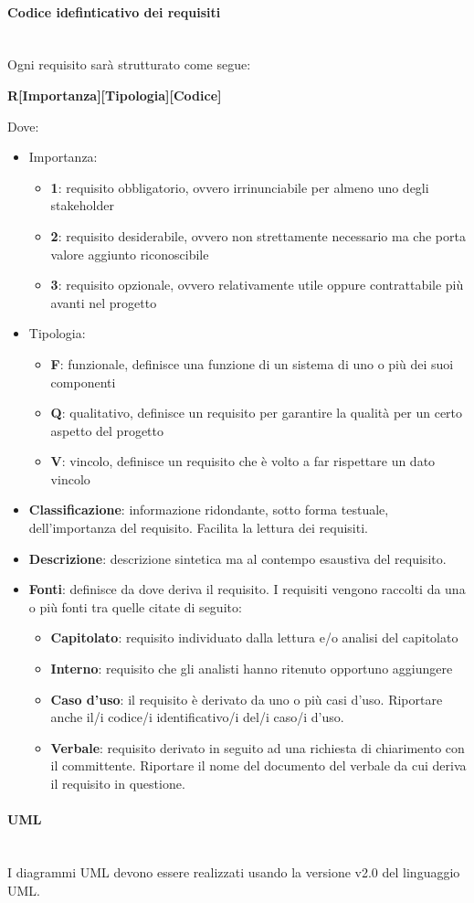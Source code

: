 \paragraph{Codice idefinticativo dei requisiti}\mbox{}\\
Ogni requisito sarà strutturato come segue:
\begin{center}
	\textbf{R[Importanza][Tipologia][Codice]}
\end{center}
Dove:
\begin{itemize}
		\item Importanza:
		\begin{itemize}
			\item \textbf{1}: requisito obbligatorio, ovvero irrinunciabile per almeno uno degli stakeholder
			\item \textbf{2}: requisito desiderabile, ovvero non strettamente necessario ma che porta valore aggiunto riconoscibile
			\item \textbf{3}: requisito opzionale, ovvero relativamente utile oppure contrattabile più avanti nel progetto
		\end{itemize}
		\item Tipologia:
		\begin{itemize}
			\item \textbf{F}: funzionale, definisce una funzione di un sistema di uno o più dei suoi componenti
			\item \textbf{Q}: qualitativo, definisce un requisito per garantire la qualità per un certo aspetto del progetto
			\item \textbf{V}: vincolo, definisce un requisito che è volto a far rispettare un dato vincolo
		\end{itemize}
	\item \textbf{Classificazione}: informazione ridondante, sotto forma testuale, dell’importanza del requisito. Facilita la lettura dei requisiti.
	\item \textbf{Descrizione}: descrizione sintetica ma al contempo esaustiva del requisito.
	\item \textbf{Fonti}: definisce da dove deriva il requisito. I requisiti vengono raccolti da una o più fonti tra quelle citate di seguito:
	\begin{itemize}
		\item \textbf{Capitolato}: requisito individuato dalla lettura e/o analisi del capitolato
		\item \textbf{Interno}: requisito che gli analisti hanno ritenuto opportuno aggiungere
		\item \textbf{Caso d’uso}: il requisito è derivato da uno o più casi d’uso. Riportare anche il/i codice/i identificativo/i del/i caso/i d’uso.
		\item \textbf{Verbale}: requisito derivato in seguito ad una richiesta di chiarimento con il committente. Riportare il nome del documento del verbale da cui deriva il requisito in questione.		
	\end{itemize}
\end{itemize}
\paragraph{UML}\mbox{}\\
I diagrammi UML devono essere realizzati usando la versione v2.0 del linguaggio UML.